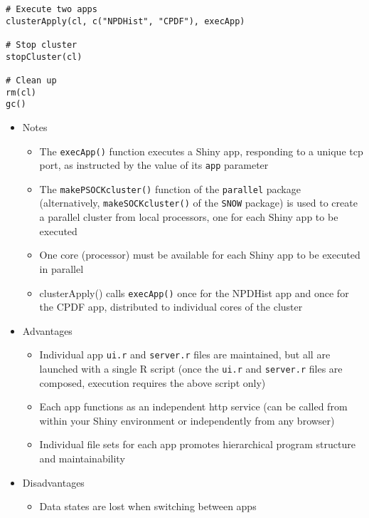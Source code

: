 \documentclass[10pt, letterpaper]{article}
\begin{document}
\begin{spacing}{1.0}
\begin{verbatim}
# Execute two apps
clusterApply(cl, c("NPDHist", "CPDF"), execApp)

# Stop cluster
stopCluster(cl)

# Clean up
rm(cl)
gc()
\end{verbatim}
\normalsize

\vspace{20pt}

\begin{itemize}
  \item Notes
    \begin{itemize}
      \item The \texttt{execApp()} function executes a Shiny app, responding to a unique tcp port, as instructed by the value of its \texttt{app} parameter
      \item The \texttt{makePSOCKcluster()} function of the \texttt{parallel} package (alternatively, \texttt{makeSOCKcluster()} of the \texttt{SNOW} package) is used to create a parallel cluster from local processors, one for each Shiny app to be executed
      \item One core (processor) must be available for each Shiny app to be executed in parallel
      \item clusterApply() calls \texttt{execApp()} once for the NPDHist app and once for the CPDF app, distributed to individual cores of the cluster
    \end{itemize}
  \item Advantages
    \begin{itemize}
      \item Individual app \texttt{ui.r} and \texttt{server.r} files are maintained, but all are launched with a single R script (once the \texttt{ui.r} and \texttt{server.r} files are composed, execution requires the above script only)
      \item Each app functions as an independent http service (can be called from within your Shiny environment or independently from any browser)
      \item Individual file sets for each app promotes hierarchical program structure and maintainability
    \end{itemize}
  \item Disadvantages
    \begin{itemize}
      \item Data states are lost when switching between apps
    \end{itemize}
\end{itemize}  

\end{spacing}
\end{document}
